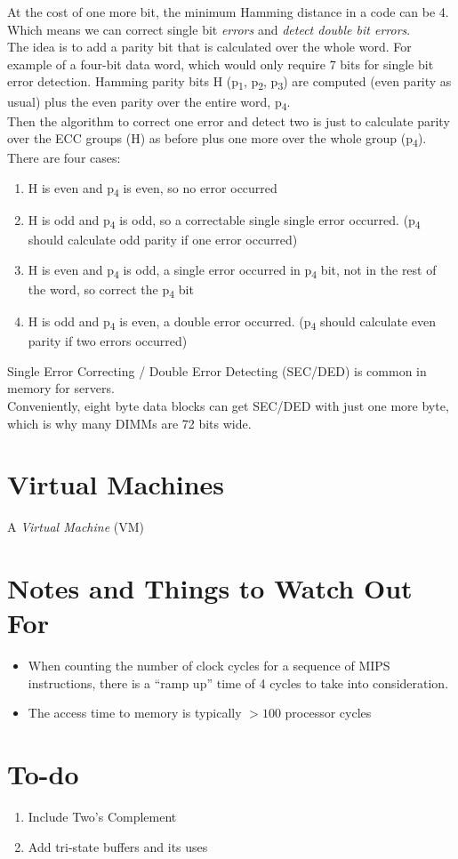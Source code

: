 \documentclass[12pt]{article}
\theoremstyle{definition}
\begin{document}
  At the cost of one more bit, the minimum Hamming distance in a code can be 4.
  Which means we can correct single bit \emph{errors} and \emph{detect double bit errors}. \\
  The idea is to add a parity bit that is calculated over the whole word.
  For example of a four-bit data word, which would only require 7 bits for single bit error detection.
  Hamming parity bits H (p\textsubscript{1}, p\textsubscript{2}, p\textsubscript{3}) are computed (even parity as usual) plus the even parity over the entire word, p\textsubscript{4}. \\
  Then the algorithm to correct one error and detect two is just to calculate parity over the ECC groups (H) as before plus one more over the whole group (p\textsubscript{4}).
  There are four cases:
  \begin{enumerate}
    \item H is even and p\textsubscript{4} is even, so no error occurred
    \item H is odd and p\textsubscript{4} is odd, so a correctable single single error occurred. (p\textsubscript{4} should calculate odd parity if one error occurred)
    \item H is even and p\textsubscript{4} is odd, a single error occurred in p\textsubscript{4} bit, not in the rest of the word, so correct the p\textsubscript{4} bit
    \item H is odd and p\textsubscript{4} is even, a double error occurred. (p\textsubscript{4} should calculate even parity if two errors occurred)
  \end{enumerate}
  Single Error Correcting / Double Error Detecting (SEC/DED) is common in memory for servers. \\
  Conveniently, eight byte data blocks can get SEC/DED with just one more byte, which is why many DIMMs are 72 bits wide.

  \section{Virtual Machines}
  A \emph{Virtual Machine} (VM)










  \newpage
  \section{Notes and Things to Watch Out For}
  \begin{itemize}
    \item When counting the number of clock cycles for a sequence of MIPS instructions, there is a ``ramp up'' time of 4 cycles to take into consideration.
    \item The access time to memory is typically $> 100$ processor cycles
  \end{itemize}

  \newpage
  \section{To-do}
  \begin{enumerate}
    \item Include Two's Complement
    \item Add tri-state buffers and its uses
  \end{enumerate}
\end{document}
